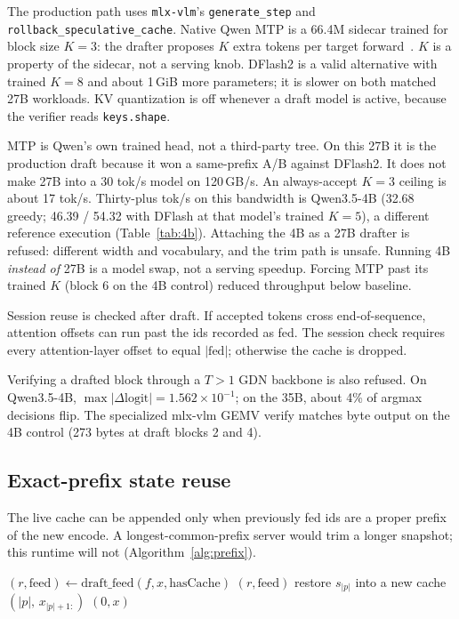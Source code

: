 \documentclass[11pt]{article}
\theoremstyle{definition}
\begin{document}
The production path uses \texttt{mlx-vlm}’s \texttt{generate\_step} and \texttt{rollback\_speculative\_cache}. Native Qwen MTP is a 66.4M sidecar trained for block size $K{=}3$: the drafter proposes $K$ extra tokens per target forward~\citep{qwen3,mlxlm990}. $K$ is a property of the sidecar, not a serving knob. DFlash2 is a valid alternative with trained $K{=}8$ and about 1\,GiB more parameters; it is slower on both matched 27B workloads. KV quantization is off whenever a draft model is active, because the verifier reads \texttt{keys.shape}.

MTP is Qwen’s own trained head, not a third-party tree. On this 27B it is the production draft because it won a same-prefix A/B against DFlash2. It does not make 27B into a 30 tok/s model on 120\,GB/s. An always-accept $K{=}3$ ceiling is about 17 tok/s. Thirty-plus tok/s on this bandwidth is Qwen3.5-4B (32.68 greedy; 46.39 / 54.32 with DFlash at that model’s trained $K{=}5$), a different reference execution (Table~\ref{tab:4b}). Attaching the 4B as a 27B drafter is refused: different width and vocabulary, and the trim path is unsafe. Running 4B \emph{instead of} 27B is a model swap, not a serving speedup. Forcing MTP past its trained $K$ (block 6 on the 4B control) reduced throughput below baseline.

Session reuse is checked after draft. If accepted tokens cross end-of-sequence, attention offsets can run past the ids recorded as fed. The session check requires every attention-layer offset to equal $|{\mathrm{fed}}|$; otherwise the cache is dropped.

Verifying a drafted block through a $T{>}1$ GDN backbone is also refused. On Qwen3.5-4B, $\max|\Delta\mathrm{logit}|=1.562{\times}10^{-1}$; on the 35B, about 4\% of argmax decisions flip. The specialized mlx-vlm GEMV verify matches byte output on the 4B control (273 bytes at draft blocks 2 and 4).

\subsection{Exact-prefix state reuse}
\label{sec:prefix}

The live cache can be appended only when previously fed ids are a proper prefix of the new encode. A longest-common-prefix server would trim a longer snapshot; this runtime will not (Algorithm~\ref{alg:prefix}).

\begin{algorithm}[t]
\caption{Exact-prefix reuse without partial trimming}
\label{alg:prefix}
\begin{algorithmic}[1]
\State $(r,\mathrm{feed})\leftarrow \mathrm{draft\_feed}(f,x,\mathrm{hasCache})$
 \Return $(r,\mathrm{feed})$
\EndIf
{}
  \State restore $s_{|p|}$ into a new cache
  \State \Return $(|p|,\, x_{|p|+1:})$
\EndIf
\State \Return $(0,x)$
\end{algorithmic}
\end{algorithm}
\end{document}
